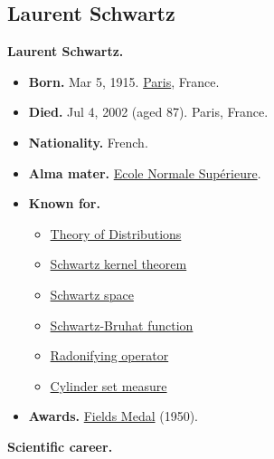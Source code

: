 \documentclass{article}
\begin{document}
\subsection{Laurent Schwartz}
\textbf{Laurent Schwartz.}
\begin{itemize}
	\item \textbf{Born.} Mar 5, 1915. \href{https://en.wikipedia.org/wiki/Paris}{Paris}, France.
	\item \textbf{Died.} Jul 4, 2002 (aged 87). Paris, France.
	\item \textbf{Nationality.} French.
	\item \textbf{Alma mater.} \href{https://en.wikipedia.org/wiki/%C3%89cole_Normale_Sup%C3%A9rieure}{Ecole Normale Sup\'erieure}.
	\item \textbf{Known for.}
	\begin{itemize}
		\item \href{https://en.wikipedia.org/wiki/Distribution_(mathematics)}{Theory of Distributions}
		\item \href{https://en.wikipedia.org/wiki/Schwartz_kernel_theorem}{Schwartz kernel theorem}
		\item \href{https://en.wikipedia.org/wiki/Schwartz_space}{Schwartz space}
		\item \href{https://en.wikipedia.org/wiki/Schwartz-Bruhat_function}{Schwartz-Bruhat function}
		\item \href{https://en.wikipedia.org/wiki/Radonifying_function}{Radonifying operator}
		\item \href{https://en.wikipedia.org/wiki/Cylinder_set_measure}{Cylinder set measure}
	\end{itemize}
	\item \textbf{Awards.} \href{https://en.wikipedia.org/wiki/Fields_Medal}{Fields Medal} (1950).
\end{itemize}
\textbf{Scientific career.}
\end{document}

